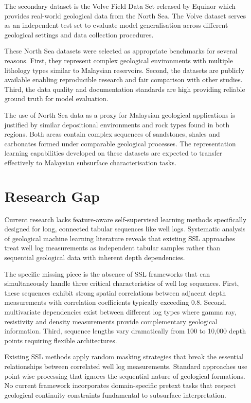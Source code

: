 The secondary dataset is the Volve Field Data Set released by Equinor which provides real-world geological data from the North Sea. The Volve dataset serves as an independent test set to evaluate model generalisation across different geological settings and data collection procedures.

These North Sea datasets were selected as appropriate benchmarks for several reasons. First, they represent complex geological environments with multiple lithology types similar to Malaysian reservoirs. Second, the datasets are publicly available enabling reproducible research and fair comparison with other studies. Third, the data quality and documentation standards are high providing reliable ground truth for model evaluation.

The use of North Sea data as a proxy for Malaysian geological applications is justified by similar depositional environments and rock types found in both regions. Both areas contain complex sequences of sandstones, shales and carbonates formed under comparable geological processes. The representation learning capabilities developed on these datasets are expected to transfer effectively to Malaysian subsurface characterisation tasks.


\section{Research Gap}

Current research lacks feature-aware self-supervised learning methods specifically designed for long, connected tabular sequences like well logs. Systematic analysis of geological machine learning literature reveals that existing SSL approaches treat well log measurements as independent tabular samples rather than sequential geological data with inherent depth dependencies.

The specific missing piece is the absence of SSL frameworks that can simultaneously handle three critical characteristics of well log sequences. First, these sequences exhibit strong spatial correlations between adjacent depth measurements with correlation coefficients typically exceeding 0.8. Second, multivariate dependencies exist between different log types where gamma ray, resistivity and density measurements provide complementary geological information. Third, sequence lengths vary dramatically from 100 to 10,000 depth points requiring flexible architectures.

Existing SSL methods apply random masking strategies that break the essential relationships between correlated well log measurements. Standard approaches use point-wise processing that ignores the sequential nature of geological formations. No current framework incorporates domain-specific pretext tasks that respect geological continuity constraints fundamental to subsurface interpretation.

